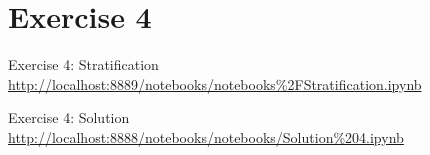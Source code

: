 \section{Exercise 4}

\begin{frame}{Exercise 4: Stratification}
    \centering
    \vfill
    \scriptsize{\url{http://localhost:8889/notebooks/notebooks\%2FStratification.ipynb}}
    \vfill
\end{frame}

\begin{frame}{Exercise 4: Solution}
    \centering
    \vfill
    \scriptsize{\url{http://localhost:8888/notebooks/notebooks/Solution\%204.ipynb}}
    \vfill
\end{frame}
